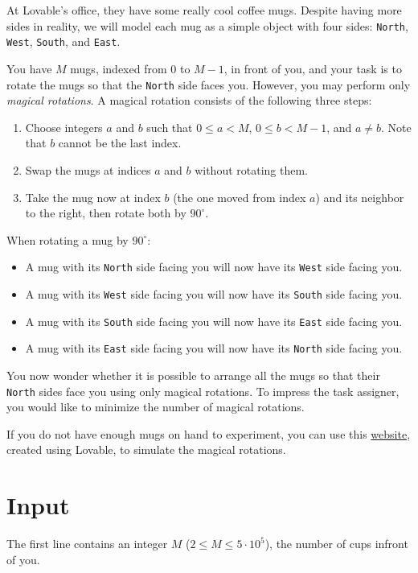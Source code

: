 

At Lovable's office, they have some really cool coffee mugs. 
Despite having more sides in reality, we will model each mug as a simple object with four sides: \texttt{North}, \texttt{West}, \texttt{South}, and \texttt{East}.

You have $M$ mugs, indexed from $0$ to $M-1$, in front of you, 
and your task is to rotate the mugs so that the \texttt{North} side faces you. 
However, you may perform only \emph{magical rotations}. 
A magical rotation consists of the following three steps:
\begin{enumerate}
  \item Choose integers $a$ and $b$ such that $0 \le a < M$, $0 \le b < M-1$, and $a \neq b$. Note that $b$ cannot be the last index.
  \item Swap the mugs at indices $a$ and $b$ without rotating them.
  \item Take the mug now at index $b$ (the one moved from index $a$) and its neighbor to the right, then rotate both by $90^\circ$.
\end{enumerate}

When rotating a mug by $90^\circ$:
\begin{itemize}
  \item A mug with its \texttt{North} side facing you will now have its \texttt{West} side facing you.
  \item A mug with its \texttt{West} side facing you will now have its \texttt{South} side facing you.
  \item A mug with its \texttt{South} side facing you will now have its \texttt{East} side facing you.
  \item A mug with its \texttt{East} side facing you will now have its \texttt{North} side facing you.
\end{itemize}

You now wonder whether it is possible to arrange all the mugs so that their \texttt{North} sides face you using only magical rotations. To impress the task assigner, you would like to minimize the number of magical rotations.

If you do not have enough mugs on hand to experiment, you can use this \href{https://rotatingmugs.lovable.app/}{website}, created using Lovable, to simulate the magical rotations.
\section*{Input}
The first line contains an integer $M$ ($2 \leq M \leq 5 \cdot 10^5$), the number of cups infront of you.

